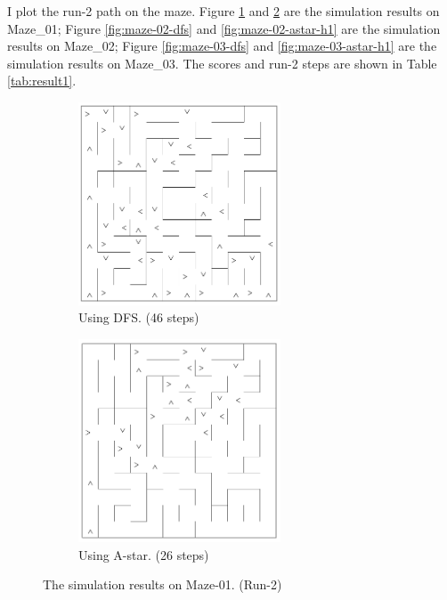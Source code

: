 \documentclass[11pt, oneside]{article}   	%
\begin{document}
I plot the run-2 path on the maze. Figure \ref{fig:maze-01-dfs} and \ref{fig:maze-01-astar-h1} are the simulation results on Maze\_01; Figure \ref{fig:maze-02-dfs} and \ref{fig:maze-02-astar-h1} are the simulation results on Maze\_02; Figure \ref{fig:maze-03-dfs} and \ref{fig:maze-03-astar-h1} are the simulation results on Maze\_03. The scores and run-2 steps are shown in Table \ref{tab:result1}.


\begin{figure}
\centering
\begin{subfigure}{7cm}
  \centering
  \includegraphics[width=6cm]{maze-01-dfs.png}
  \caption{Using DFS. (46 steps)}
  \label{fig:maze-01-dfs}
\end{subfigure}%
\begin{subfigure}{7cm}
  \centering
  \includegraphics[width=6cm]{maze-01-astar-h1.png}
  \caption{Using A-star. (26 steps)}
  \label{fig:maze-01-astar-h1}
\end{subfigure}
\caption{The simulation results on Maze-01. (Run-2)}
\label{fig:maze-01}
\end{figure}
\end{document}
